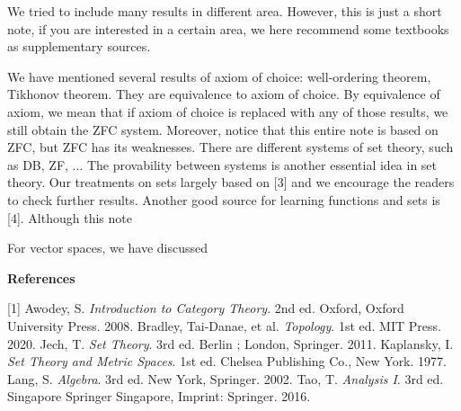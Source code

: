 \documentclass[10pt]{article}
\begin{document}
We tried to include many results in different area. However, this is just a short note, if you are interested in a certain area, we here recommend some textbooks as supplementary sources.
\par
We have mentioned several results of axiom of choice: well-ordering theorem, Tikhonov theorem. They are equivalence to axiom of choice. By equivalence of axiom, we mean that if axiom of choice is replaced with any of those results, we still obtain the ZFC system. Moreover, notice that this entire note is based on ZFC, but ZFC has its weaknesses. There are different systems of set theory, such as DB, ZF, $\dots$ The provability between systems is another essential idea in set theory. Our treatments on sets largely based on [3] and we encourage the readers to check further results. Another good source for learning functions and sets is [4]. Although this note 
\par
For vector spaces, we have discussed 


\vspace{\baselineskip}
\begin{center}
    \large\bfseries References\normalsize
\end{center}
[1] Awodey, S. \textit{Introduction to Category Theory}. 2nd ed. Oxford, Oxford University Press. 2008.
\newline
[2] Bradley, Tai-Danae, et al. \textit{Topology}. 1st ed. MIT Press. 2020.
\newline
[3] Jech, T. \textit{Set Theory}. 3rd ed. Berlin ; London, Springer. 2011.
\newline
[4] Kaplansky, I. \textit{Set Theory and Metric Spaces}. 1st ed. Chelsea Publishing Co., New York. 1977.
\newline
[5] Lang, S. \textit{Algebra}. 3rd ed. New York, Springer. 2002.
\newline
[6] Tao, T. \textit{Analysis I}. 3rd ed. Singapore Springer Singapore, Imprint: Springer. 2016.
\hindex 
\end{document}
